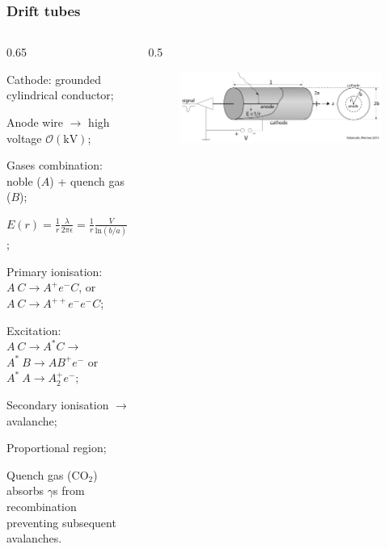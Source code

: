 \documentclass{beamer}
\begin{document}
\begin{frame}
    \frametitle{Drift tubes}
    \vspace{-4mm}
    \begin{columns}
        \begin{column}{0.65\framewidth}
            \setlength{\leftmargini}{1.1em}
            \begin{itemize}
               {\small 
		\item Cathode: grounded cylindrical conductor;
               \vspace{1.2mm}
               \item Anode wire $\rightarrow$ high voltage $\mathcal{O}(\text{kV})$; 
                \vspace{1.2mm}
                \item Gases combination: noble ($A$) + quench gas ($B$);
                \vspace{1.2mm}
                \item $E(r)=\frac{1}{r}\frac{\lambda}{2\pi \epsilon}=\frac{1}{r}\frac{V}{ \text{ln}(b/a)} \quad (a<r<b)$;
                \vspace{1.2mm}
                \item Primary ionisation: $A \ C \rightarrow A^+ e^- C$, or $A \ C \rightarrow A^{++} e^- e^- C$;
                \vspace{1.2mm}
                \item Excitation: $A \ C \rightarrow A^* C \rightarrow$ $A^* \ B \rightarrow A B^+ e^-$ or $A^* \ A \rightarrow A_2^+ e^-$;
                \vspace{1.2mm}
                \item Secondary ionisation $\rightarrow$ avalanche;
                \vspace{1.2mm}
                \item Proportional region;
                \vspace{1.2mm}
                \item Quench gas (CO$_2$) absorbs $\gamma$s from recombination preventing subsequent 
                avalanches.
                }
            \end{itemize}
        \end{column}
        \begin{column}{0.5\framewidth}
            \begin{figure}[!h]
                \centering
                \includegraphics[width =0.9\columnwidth]{figures/png/Screenshot_20240324_232621.png}

\end{figure}
\end{column}
\end{columns}
\end{frame}
\end{document}
